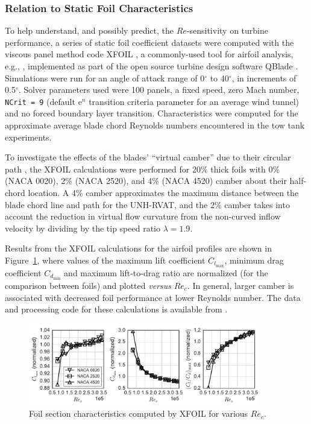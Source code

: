\documentclass[energies,article,accept,moreauthors,pdftex,10pt,a4paper]{mdpi}
\theoremstyle{mdpi}
\newcounter{ex}
\newcounter{re}
\begin{document}
\subsubsection{Relation to Static Foil Characteristics}


To help understand, and possibly predict, the $Re$-sensitivity on turbine
performance, a series of static foil coefficient datasets were computed with the
viscous panel method code XFOIL \cite{Drela1989}, a commonly-used tool for
airfoil analysis, e.g., \cite{Castelli2011, Walker2014}, implemented as part of
the open source turbine design software QBlade \cite{Marten2013}. Simulations
were run for an angle of attack range of 0$^{\circ}$ to 40$^{\circ}$, in
increments of 0.5$^{\circ}$. Solver parameters used were 100 panels, a fixed
speed, zero Mach number, \texttt{NCrit = 9} (default $\mathrm{e}^n$ transition
criteria parameter for an average wind tunnel) and no forced boundary layer
transition. Characteristics were computed for the approximate average blade
chord Reynolds numbers encountered in the tow tank experiments.

To investigate the effects of the blades' ``virtual camber'' due to their
circular path \cite{Migliore1980}, the XFOIL calculations were performed for
20\% thick foils with 0\% (NACA 0020), 2\% (NACA 2520), and 4\% (NACA 4520)
camber about their half-chord location. A 4\% camber approximates the maximum
distance between the blade chord line and path for the UNH-RVAT, and the 2\%
camber takes into account the reduction in virtual flow curvature from the
non-curved inflow velocity by dividing by the tip speed ratio $\lambda=1.9$.

Results from the XFOIL calculations for the airfoil profiles are shown in
Figure~\ref{fig:foil-Re-dep}, where values of the maximum lift coefficient
$C_{l_{\max}}$, minimum drag coefficient $C_{d_{\min}}$ and maximum
lift-to-drag ratio are normalized (for the comparison between foils) and plotted
\textit{versus} $Re_c$. In general, larger camber is associated with decreased foil
performance at lower Reynolds number. The data and processing code for these
calculations is available from \cite{Bachant2015-NACAXX20-XFOIL}.

\begin{figure}[H]
\centering
\includegraphics[width=0.9\textwidth]{figures/all_foils_re_dep}
\caption{Foil section characteristics computed by XFOIL for various $Re_c$.}
\label{fig:foil-Re-dep}
\end{figure}
\end{document}
